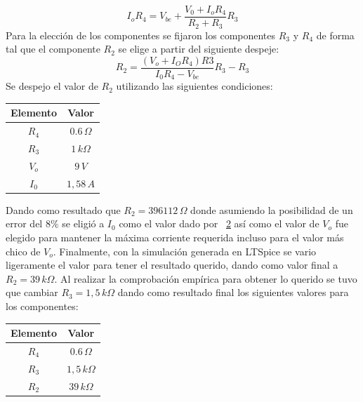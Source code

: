 \documentclass[e2_tp1_main.tex]{subfiles}
\begin{document}
$$I_oR_4=V_{be}+\frac{V_0+I_oR_4}{R_2+R_3}R_3$$
Para la elección de los componentes se fijaron los componentes $R_3$ y $R_4$ de forma tal que el componente $R_2$ se elige a partir del siguiente despeje:
$$R_2=\frac{(V_o+I_OR_4)R3}{I_0R_4-V_{be}}R_3-R_3$$
Se despejo el valor de $R_2$ utilizando las siguientes condiciones:
\begin{table}[H]
	\begin{center}
		\begin{tabular}{|c|c|}
			\hline
			Elemento & Valor\\
			\hline
			$R_4$ & $0.6\,\Omega$ \\
			\hline
			$R_3$ & $1\,k\Omega$ \\
			\hline
			$V_o$ & $9\,V$ \\
			\hline
			$I_0$ & $1,58\,A$ \\
			\hline
		\end{tabular}
		\label{tabla:CompProt}
	\end{center}
\end{table}
Dando como resultado que $R_2=396112\,\Omega$ donde asumiendo la posibilidad de un error del $8\%$ se eligió a $I_0$ como el valor dado por ~\ref{tabla:CompProt} así como el valor de $V_o$ fue elegido para mantener la máxima corriente requerida incluso para el valor más chico de $V_o$.
Finalmente, con la simulación generada en LTSpice se vario ligeramente el valor para tener el resultado querido, dando como valor final a $R_2=39\,k\Omega$.
Al realizar la comprobación empírica para obtener lo querido se tuvo que cambiar $R_3=1,5\,k\Omega$ dando como resultado final los siguientes valores para los componentes:
\begin{table}[H]
	\begin{center}
		\begin{tabular}{|c|c|}
			\hline
			Elemento & Valor\\
			\hline
			$R_4$ & $0.6\,\Omega$ \\
			\hline
			$R_3$ & $1,5\,k\Omega$ \\
			\hline
			$R_2$ & $39\,k\Omega$ \\
			\hline
		\end{tabular}
		\label{tabla:CompProt}
	\end{center}
\end{table}
\end{document}
